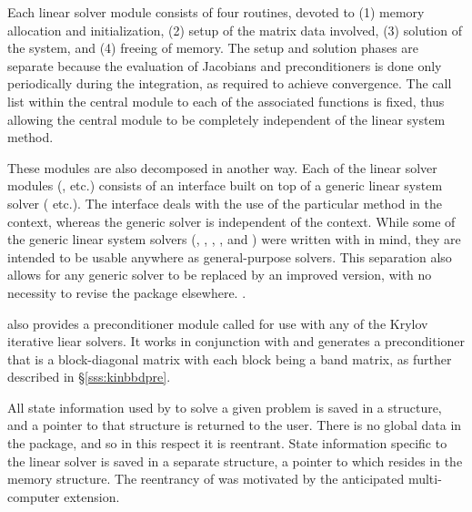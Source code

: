 Each {\kinsol} linear solver module consists of four routines, devoted to (1)
memory allocation and initialization, (2) setup of the matrix data
involved, (3) solution of the system, and (4) freeing of memory.
The setup and solution phases are separate because the evaluation of
Jacobians and preconditioners is done only periodically during the
integration, as required to achieve convergence. The call list within
the central {\kinsol} module to each of the associated functions is
fixed, thus allowing the central module to be completely independent
of the linear system method.

These modules are also decomposed in another way.
Each of the linear solver modules ({\kindense}, etc.) consists of an
interface built on top of a generic linear system solver ({\dense}
etc.).  The interface deals with the use of the particular method in
the {\kinsol} context, whereas the generic solver is independent of
the context.  While some of the generic linear system solvers
({\dense}, {\band}, {\spgmr}, {\spbcg}, and {\sptfqmr}) were written
with {\sundials} in mind, they are intended to be usable anywhere as
general-purpose solvers.  This separation also allows for any generic
solver to be replaced by an improved version, with no necessity to
revise the {\kinsol} package elsewhere. 
.

{\kinsol} also provides a preconditioner module called {\kinbbdpre} for use
with any of the Krylov iterative liear solvers. It works in conjunction
with {\nvecp} and generates a preconditioner that is
a block-diagonal matrix with each block being a band matrix, as
further described in \S\ref{sss:kinbbdpre}.

All state information used by {\kinsol} to solve a given problem is saved
in a structure, and a pointer to that structure is returned to the
user.  There is no global data in the {\kinsol} package, and so in this
respect it is reentrant. State information specific to the linear
solver is saved in a separate structure, a pointer to which resides in
the {\kinsol} memory structure. The reentrancy of {\kinsol} was motivated
by the anticipated multi-computer extension.
